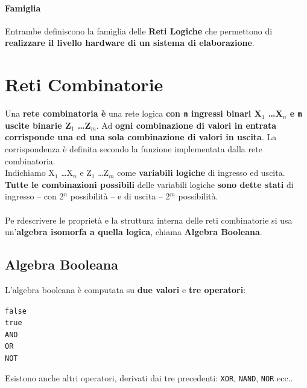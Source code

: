 \documentclass[10pt]{report}
\begin{document}
\paragraph{Famiglia} Entrambe definiscono la famiglia delle \textbf{Reti Logiche} che permettono di \textbf{realizzare il livello hardware di un sistema di elaborazione}.
\section{Reti Combinatorie}
Una \textbf{rete combinatoria è} una rete logica \textbf{con \texttt{n} ingressi binari X$_{1}$ \ldots X$_{n}$ e \texttt{m} uscite binarie Z$_{1}$ \ldots Z$_{m}$}. Ad \textbf{ogni combinazione di valori in entrata corrisponde una ed una sola combinazione di valori in uscita}. La corrispondenza è definita secondo la funzione implementata dalla rete combinatoria.\\
Indichiamo X$_{1}$ \ldots X$_{n}$ e Z$_{1}$ \ldots Z$_{m}$ come \textbf{variabili logiche} di ingresso ed uscita. \textbf{Tutte le combinazioni possibili} delle variabili logiche \textbf{sono dette stati} di ingresso -- con 2$^n$ possibilità -- e di uscita -- 2$^m$ possibilità.\\\\
Pe rdescrivere le proprietà e la struttura interna delle reti combinatorie si usa un'\textbf{algebra isomorfa a quella logica}, chiama \textbf{Algebra Booleana}.
\subsection{Algebra Booleana}
L'algebra booleana è computata su \textbf{due valori} e \textbf{tre operatori}:
\begin{center}
\begin{multicols}{2}
\texttt{false}\\\texttt{true}\\
\columnbreak
\texttt{AND}\\\texttt{OR}\\\texttt{NOT}
\end{multicols}
\end{center}
Esistono anche altri operatori, derivati dai tre precedenti: \texttt{XOR}, \texttt{NAND}, \texttt{NOR} ecc..
\end{document}
